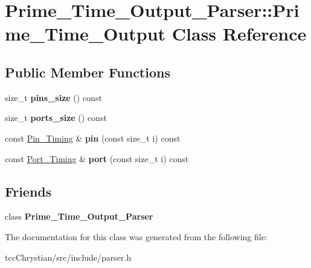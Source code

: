 \hypertarget{classPrime__Time__Output__Parser_1_1Prime__Time__Output}{\section{Prime\-\_\-\-Time\-\_\-\-Output\-\_\-\-Parser\-:\-:Prime\-\_\-\-Time\-\_\-\-Output Class Reference}
\label{classPrime__Time__Output__Parser_1_1Prime__Time__Output}
}
\subsection*{Public Member Functions}
\begin{DoxyCompactItemize}
\item 
\hypertarget{classPrime__Time__Output__Parser_1_1Prime__Time__Output_af89e7f909821e56d0e89ae62cebc5b81}{size\-\_\-t {\bfseries pins\-\_\-size} () const }\label{classPrime__Time__Output__Parser_1_1Prime__Time__Output_af89e7f909821e56d0e89ae62cebc5b81}

\item 
\hypertarget{classPrime__Time__Output__Parser_1_1Prime__Time__Output_a6fdf8bbe0ea6ecdcdecec62e0922625f}{size\-\_\-t {\bfseries ports\-\_\-size} () const }\label{classPrime__Time__Output__Parser_1_1Prime__Time__Output_a6fdf8bbe0ea6ecdcdecec62e0922625f}

\item 
\hypertarget{classPrime__Time__Output__Parser_1_1Prime__Time__Output_adfa3dff9af20ebb0872d4c775b3eeecc}{const \hyperlink{structPrime__Time__Output__Parser_1_1Pin__Timing}{Pin\-\_\-\-Timing} \& {\bfseries pin} (const size\-\_\-t i) const }\label{classPrime__Time__Output__Parser_1_1Prime__Time__Output_adfa3dff9af20ebb0872d4c775b3eeecc}

\item 
\hypertarget{classPrime__Time__Output__Parser_1_1Prime__Time__Output_a36d4fa1cf4175cce9bac2fb27ea98f72}{const \hyperlink{structPrime__Time__Output__Parser_1_1Port__Timing}{Port\-\_\-\-Timing} \& {\bfseries port} (const size\-\_\-t i) const }\label{classPrime__Time__Output__Parser_1_1Prime__Time__Output_a36d4fa1cf4175cce9bac2fb27ea98f72}

\end{DoxyCompactItemize}
\subsection*{Friends}
\begin{DoxyCompactItemize}
\item 
\hypertarget{classPrime__Time__Output__Parser_1_1Prime__Time__Output_add497bc1a470cf507522a48873d2b9b7}{class {\bfseries Prime\-\_\-\-Time\-\_\-\-Output\-\_\-\-Parser}}\label{classPrime__Time__Output__Parser_1_1Prime__Time__Output_add497bc1a470cf507522a48873d2b9b7}

\end{DoxyCompactItemize}


The documentation for this class was generated from the following file\-:\begin{DoxyCompactItemize}
\item 
tcc\-Chrystian/src/include/parser.\-h\end{DoxyCompactItemize}
